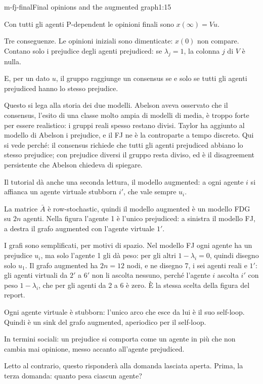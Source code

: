 \begin{slide}{m-fj-final}{Final opinions and the augmented graph}{1:15 {\color{red}}}
  \begin{discorso}
    \item Con tutti gli agenti P-dependent le opinioni finali sono $x(\infty)=Vu$.
    \item Tre conseguenze. Le opinioni iniziali sono dimenticate: $x(0)$ non compare. Contano solo i prejudice degli agenti prejudiced: se $\lambda_j=1$, la colonna $j$ di $V$ è nulla.
    \item E, per un dato $u$, il gruppo raggiunge un consensus se e solo se tutti gli agenti prejudiced hanno lo stesso prejudice.
    \item {\color{blue}Questo si lega alla storia dei due modelli. Abelson aveva osservato che il consensus, l'esito di una classe molto ampia di modelli di media, è troppo forte per essere realistico: i gruppi reali spesso restano divisi. Taylor ha aggiunto al modello di Abelson i prejudice, e il FJ ne è la controparte a tempo discreto. Qui si vede perché: il consensus richiede che tutti gli agenti prejudiced abbiano lo stesso prejudice; con prejudice diversi il gruppo resta diviso, ed è il disagreement persistente che Abelson chiedeva di spiegare.}
    \item Il tutorial dà anche una seconda lettura, il modello augmented: a ogni agente $i$ si affianca un agente virtuale stubborn $i'$, che vale sempre $u_i$.
    \item La matrice $\bar A$ è row-stochastic, quindi il modello augmented è un modello FDG su $2n$ agenti. Nella figura l'agente 1 è l'unico prejudiced: a sinistra il modello FJ, a destra il grafo augmented con l'agente virtuale $1'$.
    \item I grafi sono semplificati, per motivi di spazio. Nel modello FJ ogni agente ha un prejudice $u_i$, ma solo l'agente 1 gli dà peso: per gli altri $1-\lambda_i=0$, quindi disegno solo $u_1$. Il grafo augmented ha $2n=12$ nodi, e ne disegno 7, i sei agenti reali e $1'$: gli agenti virtuali da $2'$ a $6'$ non li ascolta nessuno, perché l'agente $i$ ascolta $i'$ con peso $1-\lambda_i$, che per gli agenti da 2 a 6 è zero. È la stessa scelta della figura del report.
    \item Ogni agente virtuale è stubborn: l'unico arco che esce da lui è il suo self-loop. Quindi è un sink del grafo augmented, aperiodico per il self-loop.
    \item In termini sociali: un prejudice si comporta come un agente in più che non cambia mai opinione, messo accanto all'agente prejudiced.
    \item Letto al contrario, questo risponderà alla domanda lasciata aperta. Prima, la terza domanda: quanto pesa ciascun agente?
  \end{discorso}
\end{slide}

